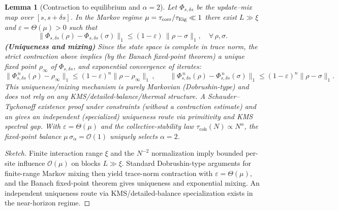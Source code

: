 \documentclass[12pt,a4paper]{article}
\newtheorem{lemma}{Lemma}[section]
\numberwithin{equation}{section}
\begin{document}
\begin{lemma}[Contraction to equilibrium and $\alpha=2$]
\label{lem:contraction}
Let $\Phi_{s,\delta s}$ be the update--mix map over $[s,s+\delta s]$. In
the Markov regime $\mu=\tau_{\mathrm{corr}}/\tau_{\rm Eig}\ll 1$ there exist
$L\gg\xi$ and $\varepsilon=\Theta(\mu)>0$ such that
\[
\|\Phi_{s,\delta s}(\rho)-\Phi_{s,\delta s}(\sigma)\|_1
\le (1-\varepsilon)\,\|\rho-\sigma\|_1,\quad\forall\,\rho,\sigma.
\]
\noindent
\textbf{(Uniqueness and mixing)}
Since the state space is complete in trace norm, the strict contraction above implies
(by the Banach fixed-point theorem) a \emph{unique} fixed point $\rho_\infty$ of $\Phi_{s,\delta s}$,
and exponential convergence of iterates:
\[
\|\Phi_{s,\delta s}^{\,n}(\rho)-\rho_\infty\|_1 \le (1-\varepsilon)^n\|\rho-\rho_\infty\|_1\,,\qquad
\|\Phi_{s,\delta s}^{\,n}(\rho)-\Phi_{s,\delta s}^{\,n}(\sigma)\|_1 \le (1-\varepsilon)^n\|\rho-\sigma\|_1.
\]
This uniqueness/mixing mechanism is \emph{purely Markovian} (Dobrushin-type) and does \emph{not}
rely on any KMS/detailed-balance/thermal structure. A Schauder--Tychonoff existence proof under constraints (without a contraction estimate) and an
gives an \emph{independent} (specialized) uniqueness route via primitivity and KMS spectral gap.
With $\varepsilon=\Theta(\mu)$ and the collective-stability law
$\tau_{\mathrm{coh}}(N)\propto N^\alpha$, the fixed-point balance
$\mu\,\sigma_\alpha=\mathcal{O}(1)$ uniquely selects $\alpha=2$.
\end{lemma}

\begin{proof}[Sketch]
Finite interaction range $\xi$ and the $N^{-2}$ normalization imply bounded per-site influence
$\mathcal{O}(\mu)$ on blocks $L\gg\xi$. Standard Dobrushin-type arguments for finite-range
Markov mixing then yield trace-norm contraction with $\varepsilon=\Theta(\mu)$, and the
Banach fixed-point theorem gives uniqueness and exponential mixing.
An independent uniqueness route via KMS/detailed-balance specialization exists in the near-horizon regime.
\end{proof}
\end{document}
